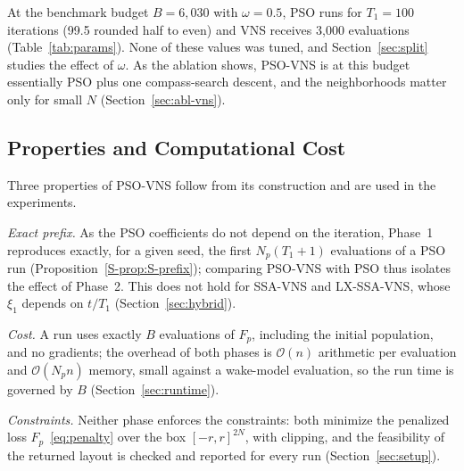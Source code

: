 At the benchmark budget $B=6{,}030$ with $\omega=0.5$, PSO runs for $T_1=100$ iterations (99.5 rounded half to even) and VNS receives 3,000 evaluations (Table~\ref{tab:params}). None of these values was tuned, and Section~\ref{sec:split} studies the effect of $\omega$. As the ablation shows, PSO-VNS is at this budget essentially PSO plus one compass-search descent, and the neighborhoods matter only for small $N$ (Section~\ref{sec:abl-vns}).

\subsection{Properties and Computational Cost}
\label{sec:psovns-props}
Three properties of PSO-VNS follow from its construction and are used in the experiments.

\emph{Exact prefix.} As the PSO coefficients do not depend on the iteration, Phase~1 reproduces exactly, for a given seed, the first $N_p(T_1+1)$ evaluations of a PSO run (Proposition~\ref{S-prop:S-prefix}); comparing PSO-VNS with PSO thus isolates the effect of Phase~2. This does not hold for SSA-VNS and LX-SSA-VNS, whose $\xi_1$ depends on $t/T_1$ (Section~\ref{sec:hybrid}).

\emph{Cost.} A run uses exactly $B$ evaluations of $F_p$, including the initial population, and no gradients; the overhead of both phases is $\mathcal O(n)$ arithmetic per evaluation and $\mathcal O(N_pn)$ memory, small against a wake-model evaluation, so the run time is governed by $B$ (Section~\ref{sec:runtime}).

\emph{Constraints.} Neither phase enforces the constraints: both minimize the penalized loss $F_p$~\eqref{eq:penalty} over the box $[-r,r]^{2N}$, with clipping, and the feasibility of the returned layout is checked and reported for every run (Section~\ref{sec:setup}).

